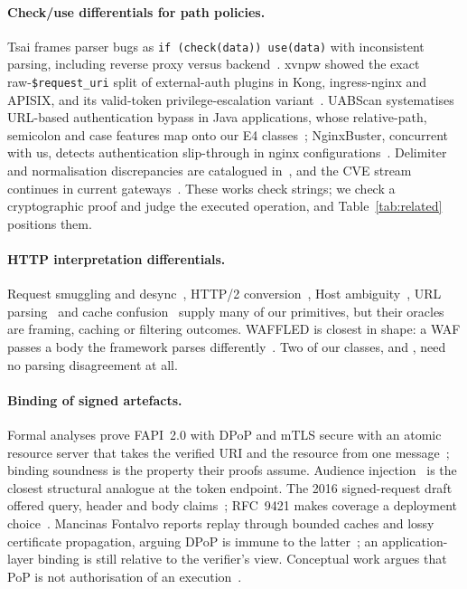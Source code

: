 \paragraph{Check/use differentials for path policies.} Tsai frames parser bugs
as \texttt{if (check(data)) use(data)} with inconsistent parsing, including
reverse proxy versus backend~\cite{p2:tsai2018breaking}. xvnpw showed the exact
raw-\texttt{\$request\_uri} split of external-auth plugins in Kong,
ingress-nginx and APISIX, and its valid-token privilege-escalation
variant~\cite{p2:xvnpw2021kong,p2:xvnpw2022ingress,p2:xvnpw2021apisix,p2:xvnpw2021tips}.
UABScan systematises URL-based authentication bypass in Java applications,
whose relative-path, semicolon and case features map onto our E4
classes~\cite{p2:zhang2025uabscan}; NginxBuster, concurrent with us, detects
authentication slip-through in nginx configurations~\cite{p2:sadeghi2026nginxbuster}.
Delimiter and normalisation discrepancies are catalogued
in~\cite{p2:doyhenard2024gotta}, and the CVE stream continues in current
gateways~\cite{p2:traefik2026_88009,p2:envoy2026_73551,p2:apisix2026_124680,p2:heimdall2026_42274,p2:oathkeeper2026_33494}.
These works check strings; we check a cryptographic proof and judge the
executed operation, and Table~\ref{tab:related} positions them.

\paragraph{HTTP interpretation differentials.} Request smuggling and
desync~\cite{jabiyev2021treqs,jabiyev2024gudifu,mu2025hdhunter,kallus2024garden,shen2022hdiff},
HTTP/2 conversion~\cite{jabiyev2022frameshifter,gavazzi2025h2fuzz}, Host
ambiguity~\cite{chen2016host}, URL parsing~\cite{reynolds2022equivocal} and
cache confusion~\cite{mirheidari2020cached,nguyen2019cpdos} supply many of our
\GB primitives, but their oracles are framing, caching or filtering outcomes.
WAFFLED is closest in shape: a WAF passes a body the framework parses
differently~\cite{akhavani2025waffled}. Two of our classes, \GA and \GC, need no
parsing disagreement at all.

\paragraph{Binding of signed artefacts.} Formal analyses prove FAPI~2.0 with
DPoP and mTLS secure with an atomic resource server that takes the verified URI
and the resource from one message~\cite{hosseyni2022tr,hosseyni2024csf,hosseyni2024tops};
binding soundness is the property their proofs assume. Audience
injection~\cite{p2:hosseyni2026audience} is the closest structural analogue at
the token endpoint. The 2016 signed-request draft offered query, header and
body claims~\cite{p2:richer2016signedhttp}; RFC~9421 makes coverage a
deployment choice~\cite{rfc9421}. Mancinas Fontalvo reports replay through
bounded \jti caches and lossy certificate propagation, arguing DPoP is immune to
the latter~\cite{mancinas2026}; an application-layer binding is still relative
to the verifier's view. Conceptual work argues that PoP is not authorisation of
an execution~\cite{p2:gallo2026beyond,kim2026tbsg}.

